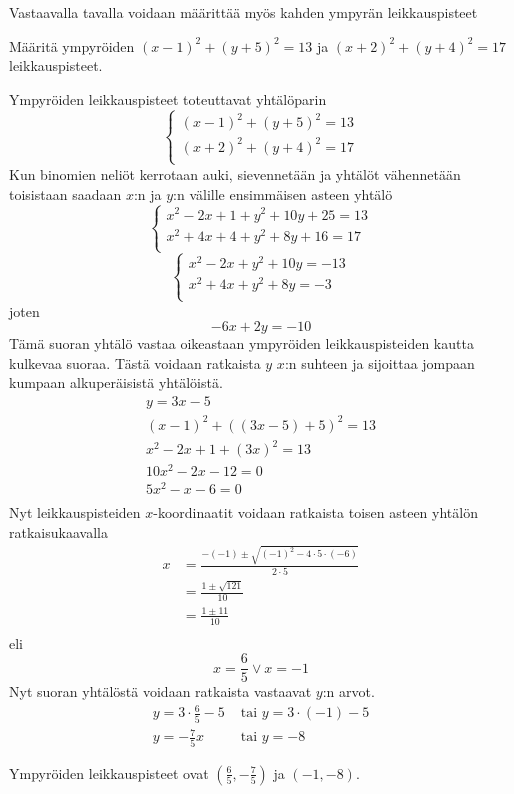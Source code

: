 Vastaavalla tavalla voidaan määrittää myös kahden ympyrän leikkauspisteet

\begin{esimerkki}
Määritä ympyröiden $(x-1)^2+(y+5)^2 = 13$ ja $(x+2)^2+(y+4)^2 = 17$ leikkauspisteet.

\begin{esimratk}
Ympyröiden leikkauspisteet toteuttavat yhtälöparin
\[
\left\{    
    \begin{array}{rcl}
        (x-1)^2+(y+5)^2 = 13 \\
        (x+2)^2+(y+4)^2 = 17 \\
    \end{array}
    \right.
\]
Kun binomien neliöt kerrotaan auki, sievennetään ja yhtälöt vähennetään toisistaan saadaan $x$:n ja $y$:n välille ensimmäisen asteen yhtälö
\[
\left\{    
    \begin{array}{rcl}
        x^2-2x+1+y^2+10y+25 = 13 \\
        x^2+4x+4+y^2+8y+16 = 17 \\
    \end{array}
    \right.
\]
\[
\left\{    
    \begin{array}{rcl}
        x^2-2x+y^2+10y= -13 \\
        x^2+4x+y^2+8y= -3 \\
    \end{array}
    \right.
\]
joten
\[
-6x+2y=-10
\]
Tämä suoran yhtälö vastaa oikeastaan ympyröiden leikkauspisteiden kautta kulkevaa suoraa. Tästä voidaan ratkaista $y$ $x$:n suhteen ja sijoittaa jompaan kumpaan alkuperäisistä yhtälöistä.
\begin{align*}
y = 3x-5 \\
(x-1)^2+((3x-5)+5)^2 = 13 \\
x^2-2x+1+(3x)^2 = 13 \\
10x^2-2x-12 = 0 \\
5x^2-x-6 = 0 \\
\end{align*}
Nyt leikkauspisteiden $x$-koordinaatit voidaan ratkaista toisen asteen yhtälön ratkaisukaavalla
\begin{align*}
x &= \frac{-(-1)\pm\sqrt{(-1)^2-4\cdot 5\cdot (-6)}}{2\cdot 5} \\
&= \frac{1\pm\sqrt{121}}{10} \\
&= \frac{1\pm 11}{10} \\
\end{align*}
eli
\[
x =  \frac{6}{5} \vee x = -1
\]
Nyt suoran yhtälöstä voidaan ratkaista vastaavat $y$:n arvot.
\begin{align*}
y = 3\cdot \frac{6}{5}-5 &\textrm{  tai  } y = 3\cdot (-1)-5 \\
y = -\frac{7}{5}x &\textrm{  tai  } y = -8
\end{align*}
\begin{esimvast}
Ympyröiden leikkauspisteet ovat $(\frac{6}{5}, -\frac{7}{5})$ ja $(-1,-8)$.
\end{esimvast}
\end{esimratk}
\end{esimerkki}

